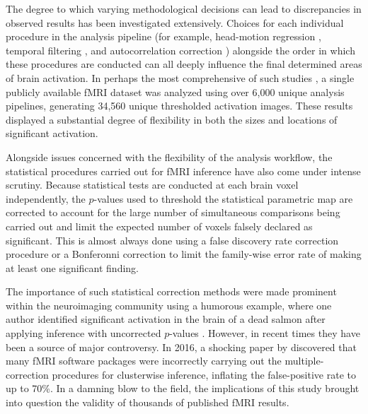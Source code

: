 The degree to which varying methodological decisions can lead to discrepancies in observed results has been investigated extensively. Choices for each individual procedure in the analysis pipeline (for example, head-motion regression \citep{Lund2005-sf}, temporal filtering \citep{Skudlarski1999-ao}, and autocorrelation correction \citep{Woolrich2001-tk}) alongside the order in which these procedures are conducted \citep{Carp2013-cm} can all deeply influence the final determined areas of brain activation. In perhaps the most comprehensive of such studies \citep{Carp2012-ph}, a single publicly available fMRI dataset was analyzed using over 6,000 unique analysis pipelines, generating 34,560 unique thresholded activation images. These results displayed a substantial degree of flexibility in both the sizes and locations of significant activation.

Alongside issues concerned with the flexibility of the analysis workflow, the statistical procedures carried out for fMRI inference have also come under intense scrutiny. Because statistical tests are conducted at each brain voxel independently, the $p$-values used to threshold the statistical parametric map are corrected to account for the large number of simultaneous comparisons being carried out and limit the expected number of voxels falsely declared as significant. This is almost always done using a false discovery rate correction procedure \citep{Benjamini1995-yy} or a Bonferonni correction to limit the family-wise error rate of making at least one significant finding. 

The importance of such statistical correction methods were made prominent within the neuroimaging community using a humorous example, where one author identified significant activation in the brain of a dead salmon after applying inference with uncorrected $p$-values \citep{Bennett2009-fh}. However, in recent times they have been a source of major controversy. In 2016, a shocking paper by \citet*{Eklund2016-ak} discovered that many fMRI software packages were incorrectly carrying out the multiple-correction procedures for clusterwise inference, inflating the false-positive rate to up to 70\%. In a damning blow to the field, the implications of this study brought into question the validity of thousands of published fMRI results. 

